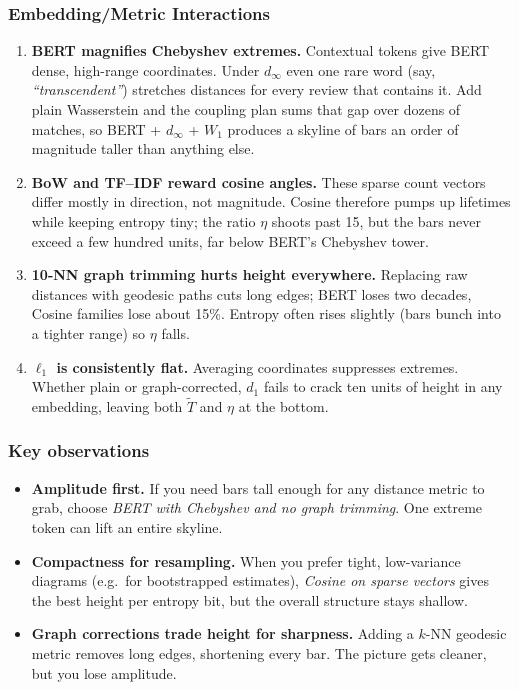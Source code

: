 \documentclass[fleqn,10pt]{SelfArx}
\begin{document}
\subsubsection*{Embedding/Metric Interactions}
\begin{enumerate}[leftmargin=*]
\item \textbf{BERT magnifies Chebyshev extremes.}  
  Contextual tokens give BERT dense, high-range coordinates.  
  Under $d_\infty$ even one rare word (say, \emph{“transcendent”}) stretches distances for every review that contains it.  
  Add plain Wasserstein and the coupling plan sums that gap over dozens of matches, so BERT + $d_\infty$ + $W_1$ produces a skyline of bars an order of magnitude taller than anything else.
\item \textbf{BoW and TF–IDF reward cosine angles.}  
  These sparse count vectors differ mostly in direction, not magnitude.  
  Cosine therefore pumps up lifetimes while keeping entropy tiny; the ratio $\eta$ shoots past 15, but the bars never exceed a few hundred units, far below BERT’s Chebyshev tower.
\item \textbf{10-NN graph trimming hurts height everywhere.}  
  Replacing raw distances with geodesic paths cuts long edges; BERT loses two decades, Cosine families lose about 15\%.  
  Entropy often rises slightly (bars bunch into a tighter range) so $\eta$ falls.
\item \textbf{$\ell_1$ is consistently flat.}  
  Averaging coordinates suppresses extremes.  
  Whether plain or graph-corrected, $d_1$ fails to crack ten units of height in any embedding, leaving both $\tilde T$ and $\eta$ at the bottom.
\end{enumerate}

\subsubsection*{Key observations}
\begin{itemize}[leftmargin=*]
\item \textbf{Amplitude first.}  If you need bars tall enough for any distance metric to grab, choose \emph{BERT with Chebyshev and no graph trimming}.  One extreme token can lift an entire skyline.
\item \textbf{Compactness for resampling.}  When you prefer tight, low-variance diagrams (e.g.\ for bootstrapped estimates), \emph{Cosine on sparse vectors} gives the best height per entropy bit, but the overall structure stays shallow.
\item \textbf{Graph corrections trade height for sharpness.}  Adding a $k$-NN geodesic metric removes long edges, shortening every bar.  The picture gets cleaner, but you lose amplitude.
\end{itemize}
\end{document}
